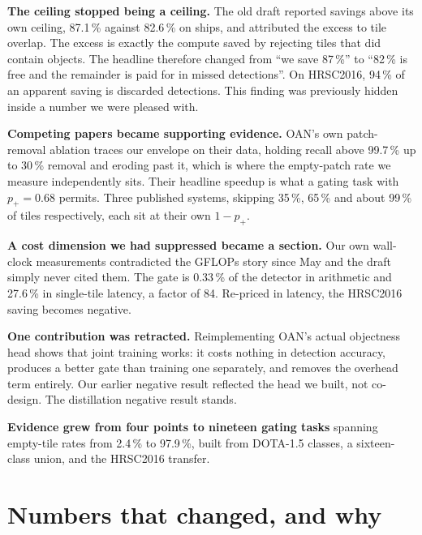 \documentclass[11pt,a4paper]{article}
\begin{document}
\textbf{The ceiling stopped being a ceiling.} The old draft reported savings
above its own ceiling, 87.1\,\% against 82.6\,\% on ships, and attributed the
excess to tile overlap. The excess is exactly the compute saved by rejecting
tiles that did contain objects. The headline therefore changed from ``we save
87\,\%'' to ``82\,\% is free and the remainder is paid for in missed
detections''. On HRSC2016, 94\,\% of an apparent saving is discarded detections.
This finding was previously hidden inside a number we were pleased with.

\textbf{Competing papers became supporting evidence.} OAN's own patch-removal
ablation traces our envelope on their data, holding recall above 99.7\,\% up to
30\,\% removal and eroding past it, which is where the empty-patch rate we
measure independently sits. Their headline speedup is what a gating task with
$p_+ = 0.68$ permits. Three published systems, skipping 35\,\%, 65\,\% and about
99\,\% of tiles respectively, each sit at their own $1 - p_+$.

\textbf{A cost dimension we had suppressed became a section.} Our own wall-clock
measurements contradicted the GFLOPs story since May and the draft simply never
cited them. The gate is 0.33\,\% of the detector in arithmetic and 27.6\,\% in
single-tile latency, a factor of 84. Re-priced in latency, the HRSC2016 saving
becomes negative.

\textbf{One contribution was retracted.} Reimplementing OAN's actual objectness
head shows that joint training works: it costs nothing in detection accuracy,
produces a better gate than training one separately, and removes the overhead
term entirely. Our earlier negative result reflected the head we built, not
co-design. The distillation negative result stands.

\textbf{Evidence grew from four points to nineteen gating tasks} spanning
empty-tile rates from 2.4\,\% to 97.9\,\%, built from DOTA-1.5 classes, a
sixteen-class union, and the HRSC2016 transfer.

\section*{Numbers that changed, and why}
\end{document}
